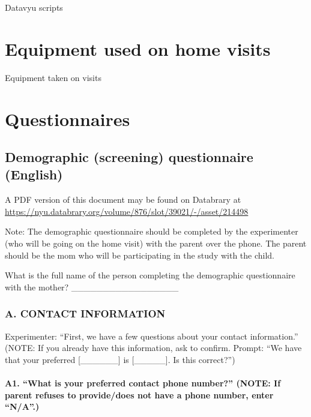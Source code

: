 \documentclass[
  12pt,
]{book}
\begin{document}
Datavyu scripts

\hypertarget{equipment-used-on-home-visits}{%
\chapter{Equipment used on home visits}\label{equipment-used-on-home-visits}}

Equipment taken on visits

\hypertarget{questionnaires-3}{%
\chapter{Questionnaires}\label{questionnaires-3}}

\hypertarget{quest_demo_english}{%
\section{Demographic (screening) questionnaire (English)}\label{quest_demo_english}}

A PDF version of this document may be found on Databrary at \url{https://nyu.databrary.org/volume/876/slot/39021/-/asset/214498}

Note: The demographic questionnaire should be completed by the experimenter (who will be going on the home visit) with the parent over the phone. The parent should be the mom who will be participating in the study with the child.

What is the full name of the person completing the demographic questionnaire with the mother? \_\_\_\_\_\_\_\_\_\_\_\_\_\_\_\_\_

\hypertarget{a.-contact-information}{%
\subsection*{A. CONTACT INFORMATION}\label{a.-contact-information}}

Experimenter: ``First, we have a few questions about your contact information.''
(NOTE: If you already have this information, ask to confirm. Prompt: ``We have that your preferred {[}\_\_\_\_\_\_{]} is {[}\_\_\_\_\_{]}. Is this correct?'')

\hypertarget{a1.-what-is-your-preferred-contact-phone-number-note-if-parent-refuses-to-providedoes-not-have-a-phone-number-enter-na.}{%
\subsubsection*{A1. ``What is your preferred contact phone number?'' (NOTE: If parent refuses to provide/does not have a phone number, enter ``N/A''.)}\label{a1.-what-is-your-preferred-contact-phone-number-note-if-parent-refuses-to-providedoes-not-have-a-phone-number-enter-na.}}
\end{document}
